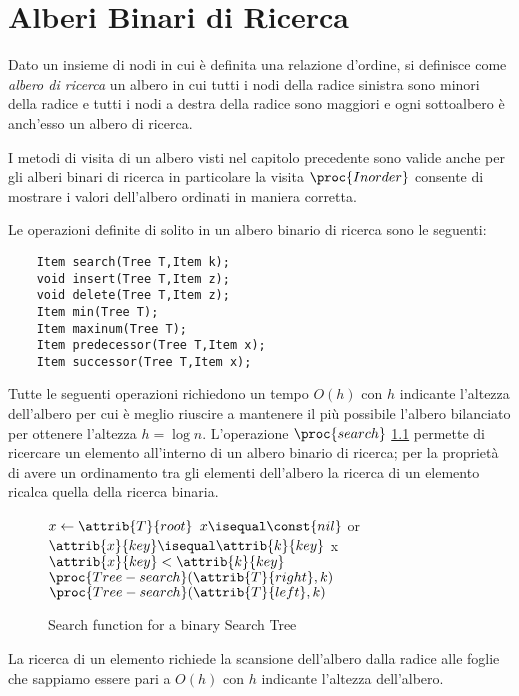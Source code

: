 \chapter{Alberi Binari di Ricerca}
Dato un insieme di nodi in cui è definita una relazione d'ordine, si definisce come \emph{albero di ricerca} un albero in cui tutti i nodi della radice sinistra sono
minori della radice e tutti i nodi a destra della radice sono maggiori e ogni sottoalbero è anch'esso un albero di ricerca.

I metodi di visita di un albero visti nel capitolo precedente sono valide anche per gli alberi binari di ricerca
in particolare la visita $\proc{Inorder}$ consente di mostrare i valori dell'albero ordinati in maniera corretta.

Le operazioni definite di solito in un albero binario di ricerca sono le seguenti:
\begin{verbatim}
    Item search(Tree T,Item k);
    void insert(Tree T,Item z);
    void delete(Tree T,Item z);
    Item min(Tree T);
    Item maxinum(Tree T);
    Item predecessor(Tree T,Item x);
    Item successor(Tree T,Item x);
\end{verbatim}
Tutte le seguenti operazioni richiedono un tempo $O(h)$ con $h$ indicante l'altezza dell'albero per cui è meglio riuscire 
a mantenere il più possibile l'albero bilanciato per ottenere l'altezza $h = \log n$.\newline
L'operazione $\proc{search}$ \ref{alg:searchTreeSearch} permette di ricercare un elemento all'interno di un albero binario di ricerca;
per la proprietà di avere un ordinamento tra gli elementi dell'albero la ricerca di un elemento ricalca quella della ricerca binaria.
\begin{figure}
    \caption{Search function for a binary Search Tree}
    \label{alg:searchTreeSearch}
    \begin{codebox}
        \li $x \gets \attrib{T}{root}$
        \li \If $x \isequal \const{nil}$ or $\attrib{x}{key} \isequal \attrib{k}{key}$
            \Then
        \li                    \Return x
        \li \If $\attrib{x}{key} < \attrib{k}{key}$
            \Then
        \li                     \Return $\proc{Tree-search}(\attrib{T}{right},k)$
        \li \Else \Return $\proc{Tree-search}(\attrib{T}{left},k)$
    \end{codebox}
\end{figure}
La ricerca di un elemento richiede la scansione dell'albero dalla radice alle foglie che sappiamo essere pari a $O(h)$ con $h$ indicante l'altezza dell'albero.

